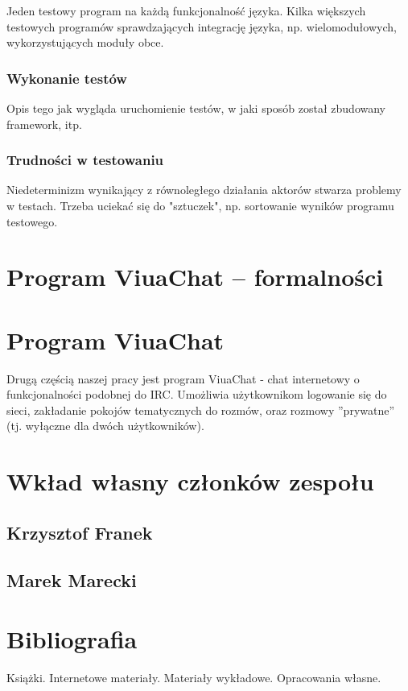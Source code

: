 \documentclass[11pt,oneside,a4paper,titlepage,onecolumn]{book}
\begin{document}
Jeden testowy program na każdą funkcjonalność języka.
Kilka większych testowych programów sprawdzających integrację języka, np. wielomodułowych, wykorzystujących
moduły obce.

\subsection{Wykonanie testów}

Opis tego jak wygląda uruchomienie testów, w jaki sposób został zbudowany framework, itp.

\subsection{Trudności w testowaniu}

Niedeterminizm wynikający z równoległego działania aktorów stwarza problemy w testach. Trzeba uciekać się do
"sztuczek", np. sortowanie wyników programu testowego.



\chapter{Program ViuaChat -- formalności}



\chapter{Program ViuaChat}
\label{program_viuachat}

Drugą częścią naszej pracy jest program ViuaChat - chat internetowy o funkcjonalności podobnej do IRC.
Umożliwia użytkownikom logowanie się do sieci, zakładanie pokojów tematycznych do rozmów, oraz rozmowy
''prywatne'' (tj. wyłączne dla dwóch użytkowników).





\chapter{Wkład własny członków zespołu}
\label{wklad_wlasny_czlonkow_zespolu}

\section{Krzysztof Franek}

\section{Marek Marecki}



\chapter{Bibliografia}

Książki. Internetowe materiały. Materiały wykładowe. Opracowania własne.
\end{document}
